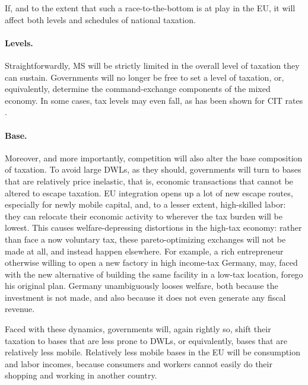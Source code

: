 \documentclass[11pt,a4paper,oneside,openright]{article}
\begin{document}


If, and to the extent that such a race-to-the-bottom is at play in the \gls{EU}, it will affect both levels and schedules of national taxation.

\paragraph{Levels.} Straightforwardly, \gls{MS} will be strictly limited in the overall level of taxation they can sustain. 
Governments will no longer be free to set a level of taxation, or, equivalently, determine the command-exchange components of the mixed economy. 
In some cases, tax levels may even fall, as has been shown for \gls{CIT} rates \citep{Piatkowski2008}.


\paragraph{Base.} Moreover, and more importantly, competition will also alter the base composition of taxation. 
To avoid large \glspl{DWL}, as they should, governments will turn to bases that are relatively price inelastic, that is, economic transactions that cannot be altered to escape taxation. 
\gls{EU} integration opens up a lot of new escape routes, especially for newly mobile capital, and, to a lesser extent, high-skilled labor: 
they can relocate their economic activity to wherever the tax burden will be lowest. 
This causes welfare-depressing distortions in the high-tax economy: 
rather than face a now voluntary tax, these pareto-optimizing exchanges will not be made at all, and instead happen elsewhere. 
For example, a rich entrepreneur otherwise willing to open a new factory in high income-tax Germany, may, faced with the new alternative of building the same facility in a low-tax location, forego his original plan. 
Germany unambiguously looses welfare, both because the investment is not made, and also because it does not even generate any fiscal revenue.

Faced with these dynamics, governments will, again rightly so, shift their taxation to bases that are less prone to \glspl{DWL}, or equivalently, bases that are relatively less mobile. 
Relatively less mobile bases in the \gls{EU} will be consumption and labor incomes, because consumers and workers cannot easily do their shopping and working in another country. 
\end{document}
